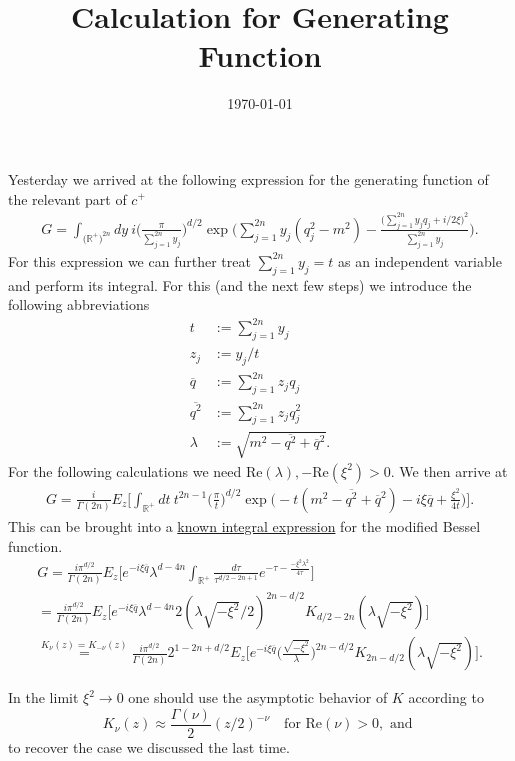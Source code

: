 \documentclass[a4paper,11pt]{article}
\begin{document}
\title{Calculation for Generating Function}
\author{ }
\date{\today}
\maketitle


Yesterday we arrived at the following expression for 
the generating function of 
the relevant part of \(c^+\)
\begin{align}
G=\int_{\big(\mathbb{R}^+\big)^{2n}}dy ~i \bigg( \frac{\pi}{\sum_{j=1}^{2n}y_j}\bigg)^{d/2}
\exp\Bigg(\sum_{j=1}^{2n}y_j(q_j^2-m^2)-\frac{\big(\sum_{j=1}^{2n}y_j q_j + i/2 \xi\big)^2}{\sum_{j=1}^{2n}y_j}\Bigg).
\end{align}
For this expression we can further treat \(\sum_{j=1}^{2n}y_j=t\) 
as an independent variable and perform its integral. For this (and the next few steps) 
we introduce the following abbreviations
\begin{align}
  t&:=\sum_{j=1}^{2n}y_j\\
  z_j&:=y_j/t\\
  \overline{q}&:=\sum_{j=1}^{2n} z_j q_j\\
  \overline{q^2}&:=\sum_{j=1}^{2n} z_j q_j^2\\
  \lambda&:=\sqrt{m^2-\overline{q^2}+\overline{q}^2}.
\end{align}
For the following calculations we need 
\(\text{Re}(\lambda),-\text{Re}(\xi^2)>0\). 
We then arrive at 
\begin{align}
  G=\frac{i}{\Gamma(2n)}E_z\Bigg[\int_{\mathbb{R}^+}dt ~t^{2n-1}\bigg(\frac{\pi}{t}\bigg)^{d/2} 
  \exp\bigg(-t(m^2-\overline{q^2}+\overline{q}^2)-i\xi \overline{q}+\frac{\xi^2}{4 t}\bigg)\Bigg].
\end{align}
This can be brought into a  
\href{https://dlmf.nist.gov/10.32#E10}{known integral expression}
for the 
 modified Bessel function.
\begin{align}
  G=\frac{i \pi^{d/2}}{\Gamma(2n)}E_z\Bigg[e^{-i \xi \overline{q}}\lambda^{d-4n}\int_{\mathbb{R}^+}\frac{d\tau}{\tau^{d/2-2n +1}}e^{-\tau - \frac{-\xi^2 \lambda^2}{4 \tau}} \Bigg]\\
  =\frac{i \pi^{d/2}}{\Gamma(2n)}E_z\bigg[e^{-i\xi \overline{q}} \lambda^{d-4n}2 (\lambda \sqrt{-\xi^2}/2)^{2n-d/2}K_{d/2-2n}(\lambda \sqrt{-\xi^2}) \bigg]\\
  \overset{K_\nu(z)=K_{-\nu}(z)}{=}\frac{i \pi^{d/2}}{\Gamma(2n)}2^{1-2n+d/2}E_z\Bigg[e^{-i\xi\overline{q}}\bigg(\frac{\sqrt{-\xi^2}}{\lambda}\bigg)^{2n-d/2}K_{2n-d/2}(\lambda\sqrt{-\xi^2}) \Bigg].
\end{align}

In the limit \(\xi^2\rightarrow 0\) one should 
use the asymptotic behavior of \(K\) according to
\begin{equation}
K_\nu(z)\approx \frac{\Gamma(\nu)}{2} (z/2)^{-\nu} \quad \text{for Re}(\nu)>0, \text{ and }  
\end{equation}
to recover the case we discussed the last time.
\end{document}
